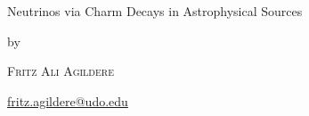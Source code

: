 \begin{titlepage}
		\centering
		\null
		\vspace{9.0\baselineskip}
		{\Huge{Neutrinos via Charm Decays in Astrophysical Sources}\par}
		\vspace{4.5\baselineskip}
		by\par
		{\Large{\textsc{Fritz Ali Agildere}\par}}\href{mailto:fritz.agildere@udo.edu}{fritz.agildere@udo.edu}
		\vfill\null
\end{titlepage}

